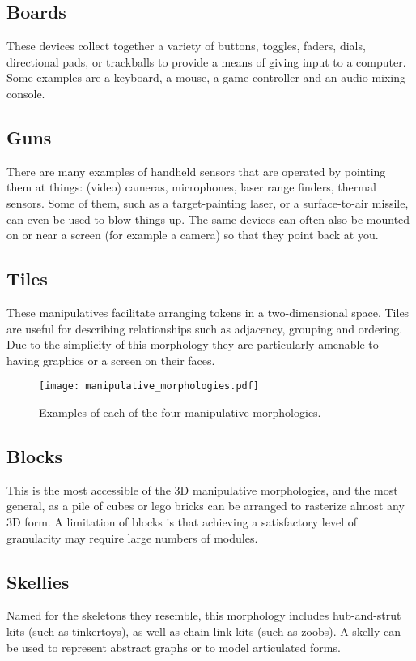 \subsection{Boards}
%
These devices collect together a variety of buttons, toggles, faders, dials, directional pads, or trackballs to provide a means of giving input to a computer. Some examples are a keyboard, a mouse, a game controller and an audio mixing console.

\subsection{Guns}
%
There are many examples of handheld sensors that are operated by pointing them at things: (video) cameras, microphones, laser range finders, thermal sensors. Some of them, such as a target-painting laser, or a surface-to-air missile, can even be used to blow things up. The same devices can often also be mounted on or near a screen (for example a camera) so that they point back at you.

\subsection{Tiles}
%
These manipulatives facilitate arranging tokens in a two-dimensional space. Tiles are useful for describing relationships such as adjacency, grouping and ordering. Due to the simplicity of this morphology they are particularly amenable to having graphics or a screen on their faces. 

\begin{figure}[tbh]
  \centering
    \texttt{[image: manipulative\_morphologies.pdf]}
  \caption{Examples of each of the four manipulative morphologies.}
  \label{fig:manipulative_morphologies}
\end{figure}

\subsection{Blocks}
%
This is the most accessible of the 3D manipulative morphologies, and the most general, as a pile of cubes or lego bricks can be arranged to rasterize almost any 3D form. A limitation of blocks is that achieving a satisfactory level of granularity may require large numbers of modules.

\subsection{Skellies}
%
Named for the skeletons they resemble, this morphology includes hub-and-strut kits (such as tinkertoys), as well as chain link kits (such as zoobs). A skelly can be used to represent abstract graphs or to model articulated forms.


